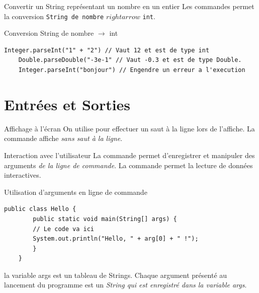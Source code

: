 \documentclass{report}
\begin{document}
\begin{Syntaxe*}{Convertir un String représentant un nombre en un entier}{}
Les commandes  permet la conversion \texttt{\footnotesize{String de nombre}} $rightarrow$ \texttt{\footnotesize{int}}.
\end{Syntaxe*}

\begin{EExample*}{Conversion String de nombre $\rightarrow$ int}{}
\begin{lstlisting}[style=JavaDraculaWhite]
	Integer.parseInt("1" + "2") // Vaut 12 et est de type int
	Double.parseDouble("-3e-1" // Vaut -0.3 et est de type Double.
	Integer.parseInt("bonjour") // Engendre un erreur a l'execution
\end{lstlisting}
\end{EExample*}
% 
\section{Entrées et Sorties}
\begin{Syntaxe*}{Affichage à l'écran}{}
On utilise  pour effectuer un saut à la ligne lors de l'affiche. La commande  affiche \textit{sans saut à la ligne}. 
\end{Syntaxe*}
\begin{Syntaxe*}{Interaction avec l'utilisateur}{}
La commande  permet d'enregistrer et manipuler des arguments 
\textit{de la ligne de commande}. La commande  permet la lecture
de données interactives. 
\end{Syntaxe*}

\begin{EExample*}{Utilisation d'arguments en ligne de commande}{}
\begin{lstlisting}[style=JavaDraculaWhite]
	public class Hello {
	    public static void main(String[] args) {
		// Le code va ici
		System.out.println("Hello, " + arg[0] + " !");
		}
	}
\end{lstlisting}
\end{EExample*}
\begin{note}
la variable args est un tableau de Strings. Chaque argument présenté au lancement du programme est un
\textit{String qui est enregistré dans la variable args}. 
\end{note}
\end{document}
